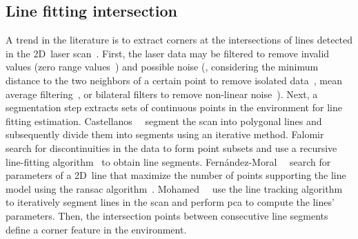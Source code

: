 \subsection{Line fitting intersection}\label{sec:features:background:line-fitting}

A trend in the literature is to extract corners at the intersections of
lines detected in the 2D~laser
scan~\cite{castellanos:mfi:1996,roumeliotis-bekey:iros:2000,jung:tits:2008,falomir:prl:2013,fernandez-moral:ijrr:2015,mohamed:isprs-arxiv:2016,zhao:icsess:2016,lin:yac:2017,qu:robio:2018,liu:electronics:2022,liu:sensors:2023}.
First, the laser data may be filtered to remove invalid values
(zero range values~\cite{jung:tits:2008}) and possible noise
(\eg, considering the minimum distance to the two neighbors of
a certain point to remove isolated data~\cite{jung:tits:2008},
mean average filtering~\cite{liu:electronics:2022}, or bilateral filters
to remove non-linear noise~\cite{liu:sensors:2023}).
Next, a segmentation step extracts sets of continuous points
in the environment for line fitting estimation.
Castellanos~\etal~\cite{castellanos:mfi:1996} segment the scan into
polygonal lines and subsequently divide them into
segments using an iterative method.
Falomir~\etal~\cite{falomir:prl:2013} search for discontinuities
in the data to form point subsets and use a recursive line-fitting
algorithm~\cite{xavier:icra:2005} to obtain line segments.
Fernández-Moral~\etal~\cite{fernandez-moral:ijrr:2015} search for
parameters of a 2D~line that maximize the number of points
supporting the line model using the \gls{ransac}
algorithm~\cite{fischler-bolles:cacm:1981}.
Mohamed~\etal~\cite{mohamed:isprs-arxiv:2016} use the line tracking
algorithm~\cite{munoz:ropec:2013} to iteratively segment lines
in the scan and perform \gls{pca} to compute the lines' parameters.
Then, the intersection points between consecutive line segments
define a corner feature in the environment.

